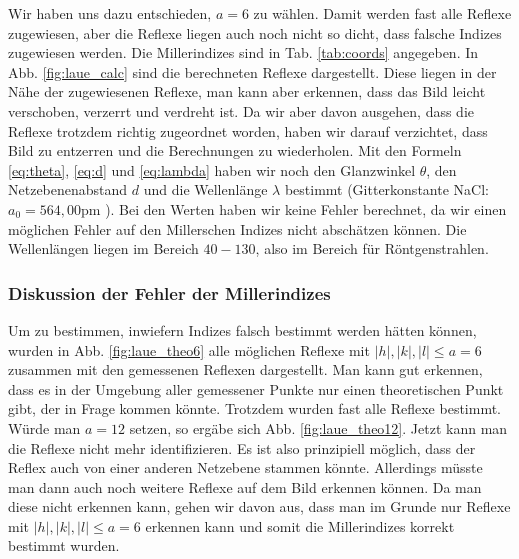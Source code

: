 Wir haben uns dazu entschieden, $a = 6$ zu wählen. Damit werden fast alle Reflexe zugewiesen, aber die Reflexe liegen auch noch nicht so dicht, dass falsche Indizes zugewiesen werden. Die Millerindizes sind in Tab. \ref{tab:coords} angegeben. In Abb. \ref{fig:laue_calc} sind die berechneten Reflexe dargestellt. Diese liegen in der Nähe der zugewiesenen Reflexe, man kann aber erkennen, dass das Bild leicht verschoben, verzerrt und verdreht ist. Da wir aber davon ausgehen, dass die Reflexe trotzdem richtig zugeordnet worden, haben wir darauf verzichtet, dass Bild zu entzerren und die Berechnungen zu wiederholen. Mit den Formeln \ref{eq:theta}, \ref{eq:d} und \ref{eq:lambda} haben wir noch den Glanzwinkel $\theta$, den Netzebenenabstand $d$ und die Wellenlänge $\lambda$ bestimmt (Gitterkonstante NaCl: $a_0 = 564,00 \si{\pico\meter}$ \cite{wiki_nacl}). Bei den Werten haben wir keine Fehler berechnet, da wir einen möglichen Fehler auf den Millerschen Indizes nicht abschätzen können. Die Wellenlängen liegen im Bereich $40 - 130$, also im Bereich für Röntgenstrahlen.

\subsubsection{Diskussion der Fehler der Millerindizes}
Um zu bestimmen, inwiefern Indizes falsch bestimmt werden hätten können, wurden in Abb. \ref{fig:laue_theo6} alle möglichen Reflexe mit $|h|,|k|,|l| \leq a = 6$ zusammen mit den gemessenen Reflexen dargestellt. Man kann gut erkennen, dass es in der Umgebung aller gemessener Punkte nur einen theoretischen Punkt gibt, der in Frage kommen könnte. Trotzdem wurden fast alle Reflexe bestimmt. Würde man $a = 12$ setzen, so ergäbe sich Abb. \ref{fig:laue_theo12}. Jetzt kann man die Reflexe nicht mehr identifizieren. Es ist also prinzipiell möglich, dass der Reflex auch von einer anderen Netzebene stammen könnte. Allerdings müsste man dann auch noch weitere Reflexe auf dem Bild erkennen können. Da man diese nicht erkennen kann, gehen wir davon aus, dass man im Grunde nur Reflexe mit $|h|,|k|,|l| \leq a = 6$ erkennen kann und somit die Millerindizes korrekt bestimmt wurden.

